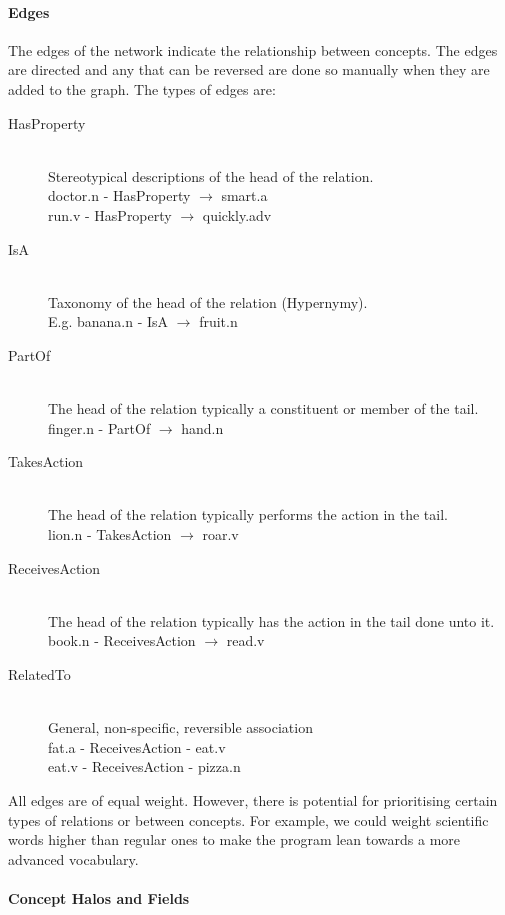 \paragraph{Edges}
The edges of the network indicate the relationship between concepts. The edges are directed and any that can be reversed are done so manually when they are added to the graph. The types of edges are:
\begin{description}
\item[HasProperty] \hfill \\ Stereotypical descriptions of the head of the relation. \hfill \\ doctor.n - HasProperty $\rightarrow$ smart.a \hfill \\ run.v - HasProperty $\rightarrow$ quickly.adv
\item[IsA] \hfill \\ Taxonomy of the head of the relation (Hypernymy). \hfill \\ E.g. banana.n - IsA $\rightarrow$ fruit.n
\item[PartOf] \hfill \\ The head of the relation typically a constituent or member of the tail.  \hfill \\ finger.n - PartOf $\rightarrow$ hand.n
\item[TakesAction] \hfill \\The head of the relation typically performs the action in the tail. \hfill \\ lion.n - TakesAction $\rightarrow$ roar.v
\item[ReceivesAction] \hfill \\The head of the relation typically has the action in the tail done unto it. \hfill \\ book.n - ReceivesAction $\rightarrow$ read.v
\item[RelatedTo] \hfill \\ General, non-specific, reversible association \hfill \\ fat.a - ReceivesAction - eat.v \hfill \\ eat.v - ReceivesAction - pizza.n
\end{description}

All edges are of equal weight. However, there is potential for prioritising certain types of relations or between concepts. For example, we could weight scientific words higher than regular ones to make the program lean towards a more advanced vocabulary.


\paragraph{Concept Halos and Fields}

